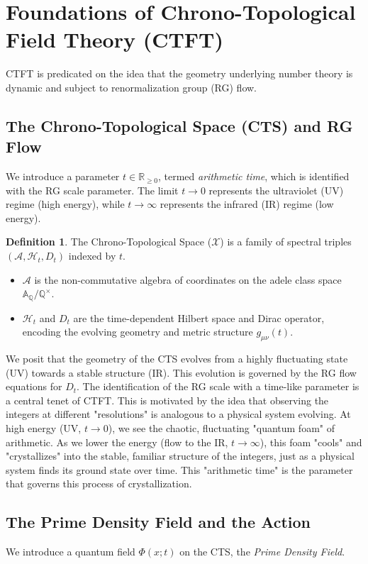 \documentclass[11pt, a4paper]{article}
\theoremstyle{definition}
\newtheorem{definition}{Definition}[section]
\newcommand{\Q}{\mathbb{Q}}
\newcommand{\R}{\mathbb{R}}
\newcommand{\A}{\mathbb{A}}
\newcommand{\CTS}{\mathcal{X}}
\newcommand{\Hilb}{\mathcal{H}}
\newcommand{\Alg}{\mathscr{A}}
\begin{document}
\section{Foundations of Chrono-Topological Field Theory (CTFT)}
CTFT is predicated on the idea that the geometry underlying number theory is dynamic and subject to renormalization group (RG) flow.

\subsection{The Chrono-Topological Space (CTS) and RG Flow}
We introduce a parameter $t \in \R_{\geq 0}$, termed \textit{arithmetic time}, which is identified with the RG scale parameter. The limit $t\to 0$ represents the ultraviolet (UV) regime (high energy), while $t\to\infty$ represents the infrared (IR) regime (low energy).

\begin{definition}
The Chrono-Topological Space ($\CTS$) is a family of spectral triples $(\Alg, \Hilb_t, D_t)$ indexed by $t$.
\begin{itemize}
    \item $\Alg$ is the non-commutative algebra of coordinates on the adele class space $\A_\Q/\Q^\times$.
    \item $\Hilb_t$ and $D_t$ are the time-dependent Hilbert space and Dirac operator, encoding the evolving geometry and metric structure $g_{\mu\nu}(t)$.
\end{itemize}
\end{definition}

We posit that the geometry of the CTS evolves from a highly fluctuating state (UV) towards a stable structure (IR). This evolution is governed by the RG flow equations for $D_t$. The identification of the RG scale with a time-like parameter is a central tenet of CTFT. This is motivated by the idea that observing the integers at different "resolutions" is analogous to a physical system evolving. At high energy (UV, $t \to 0$), we see the chaotic, fluctuating "quantum foam" of arithmetic. As we lower the energy (flow to the IR, $t \to \infty$), this foam "cools" and "crystallizes" into the stable, familiar structure of the integers, just as a physical system finds its ground state over time. This "arithmetic time" is the parameter that governs this process of crystallization.

\subsection{The Prime Density Field and the Action}
We introduce a quantum field $\Phi(x; t)$ on the CTS, the \textit{Prime Density Field}.
\end{document}
